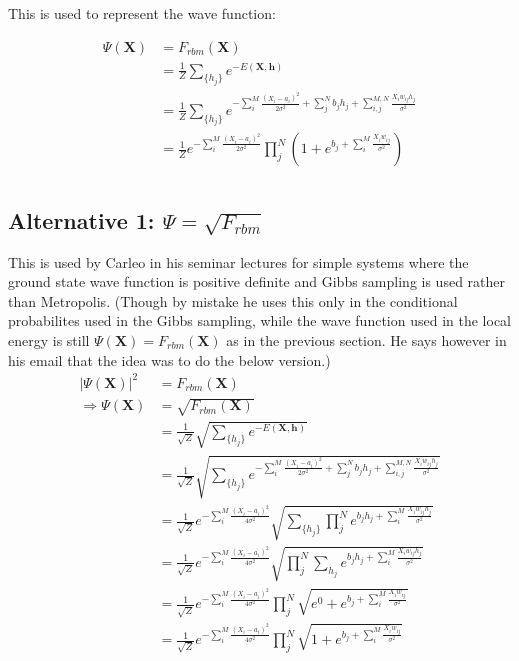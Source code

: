 \documentclass[norsk,a4paper,11pt]{article}
\begin{document}
This is used to represent the wave function:

\begin{align}
\Psi (\mathbf{X}) &= F_{rbm}(\mathbf{X}) \\
&= \frac{1}{Z}\sum_{\{h_j\}} e^{-E(\mathbf{X}, \mathbf{h})} \\
&= \frac{1}{Z} \sum_{\{h_j\}} e^{-\sum_i^M \frac{(X_i - a_i)^2}{2\sigma^2} + \sum_j^N b_j h_j + \sum_{i,j}^{M,N} \frac{X_i w_{ij} h_j}{\sigma^2}} \\
&= \frac{1}{Z} e^{-\sum_i^M \frac{(X_i - a_i)^2}{2\sigma^2}} \prod_j^N (1 + e^{b_j + \sum_i^M \frac{X_i w_{ij}}{\sigma^2}}) \\
\end{align}


\subsection{Alternative 1: $\Psi = \sqrt{F_{rbm}}$}
This is used by Carleo in his seminar lectures for simple systems where the ground state wave function is positive definite and Gibbs sampling is used rather than Metropolis. (Though by mistake he uses this only in the conditional probabilites used in the Gibbs sampling, while the wave function used in the local energy is still $\Psi (\mathbf{X}) = F_{rbm}(\mathbf{X})$ as in the previous section. He says however in his email that the idea was to do the below version.)
\begin{align}
	|\Psi (\mathbf{X})|^2 &= F_{rbm}(\mathbf{X}) \\
	\Rightarrow \Psi (\mathbf{X}) &= \sqrt{F_{rbm}(\mathbf{X})} \\
	&= \frac{1}{\sqrt{Z}}\sqrt{\sum_{\{h_j\}} e^{-E(\mathbf{X}, \mathbf{h})}} \\
	&= \frac{1}{\sqrt{Z}} \sqrt{\sum_{\{h_j\}} e^{-\sum_i^M \frac{(X_i - a_i)^2}{2\sigma^2} + \sum_j^N b_j h_j + \sum_{i,j}^{M,N} \frac{X_i w_{ij} h_j}{\sigma^2}} }\\
	&= \frac{1}{\sqrt{Z}} e^{-\sum_i^M \frac{(X_i - a_i)^2}{4\sigma^2}} \sqrt{\sum_{\{h_j\}} \prod_j^N e^{b_j h_j + \sum_i^M \frac{X_i w_{ij} h_j}{\sigma^2}}} \\
	&= \frac{1}{\sqrt{Z}} e^{-\sum_i^M \frac{(X_i - a_i)^2}{4\sigma^2}} \sqrt{\prod_j^N \sum_{h_j}  e^{b_j h_j + \sum_i^M \frac{X_i w_{ij} h_j}{\sigma^2}}} \\
	&= \frac{1}{\sqrt{Z}} e^{-\sum_i^M \frac{(X_i - a_i)^2}{4\sigma^2}} \prod_j^N \sqrt{e^0 + e^{b_j + \sum_i^M \frac{X_i w_{ij}}{\sigma^2}}} \\
	&= \frac{1}{\sqrt{Z}} e^{-\sum_i^M \frac{(X_i - a_i)^2}{4\sigma^2}} \prod_j^N \sqrt{1 + e^{b_j + \sum_i^M \frac{X_i w_{ij}}{\sigma^2}}} \\
\end{align}
\end{document}
